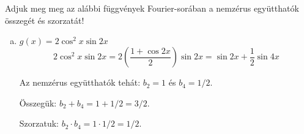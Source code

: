\begin{exercise}{%
    Adjuk meg meg az alábbi függvények Fourier-sorában a nemzérus együtthatók
    összegét és szorzatát!
  }
{\begin{enumerate}[a)]
            Az nemzérus együtthatók tehát: $a_2 = 3$ és $a_6 = 1$.

            Összegük: $a_2 + a_6 = 3 + 1 = 4$.

            Szorzatuk: $a_2 \cdot a_6 = 3 \cdot 1 = 3$.

      \item $g(x) = 2 \cos^2 x \sin 2x$
            \[
              2 \cos^2 x \sin 2x
              = 2 \left( \frac{1 + \cos 2x}{2} \right) \sin 2x
              = \sin 2x + \frac{1}{2} \sin 4x
            \]

            Az nemzérus együtthatók tehát: $b_2 = 1$ és $b_4 = 1/2$.

            Összegük: $b_2 + b_4 = 1 + 1/2 = 3/2$.

            Szorzatuk: $b_2 \cdot b_4 = 1 \cdot 1/2 = 1/2$.
    \end{enumerate}
  }
\end{exercise}
